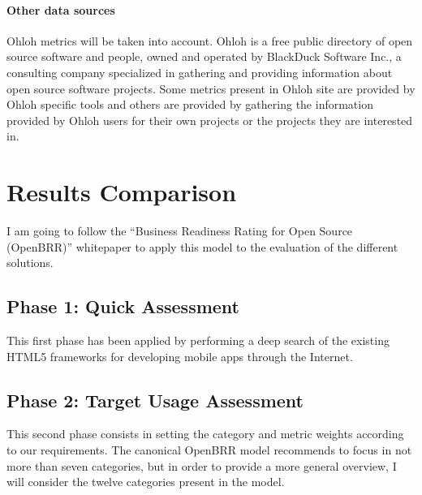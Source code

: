 \documentclass[a4paper,12pt]{book}
\begin{document}
\subsubsection{Other data sources}
Ohloh metrics will be taken into account. Ohloh\cite{Ohloh} is a free public
directory of open source software and people, owned and operated by BlackDuck
Software Inc., a consulting company specialized in gathering and providing
information about open source software projects. Some metrics present in Ohloh
site are provided by Ohloh specific tools and others are provided by gathering
the information provided by Ohloh users for their own projects or the projects
they are interested in.



\chapter{Results Comparison}
\label{chap:results}

I am going to follow the ``Business Readiness Rating for Open Source
(OpenBRR)'' whitepaper\cite{OpenBRRWhitepaper} to apply this model to the
evaluation of the different solutions.

\section{Phase 1: Quick Assessment}
\label{sec:phase1}
This first phase has been applied by performing a deep search of the existing HTML5 frameworks for developing mobile apps through the Internet.




\section{Phase 2: Target Usage Assessment}
\label{sec:phase2}
This second phase consists in setting the category and metric weights according to our requirements. The canonical OpenBRR model recommends to focus in not more than seven categories, but in order to provide a more general overview, I will consider the twelve categories present in the model.
\end{document}

